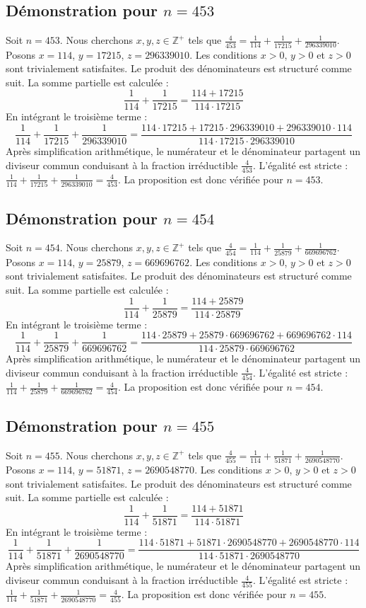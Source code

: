 \documentclass[11pt,a4paper]{article}
\begin{document}
\subsection{Démonstration pour $n = 453$}
Soit $n = 453$. Nous cherchons $x, y, z \in \mathbb{Z}^{+}$ tels que $\frac{4}{453} = \frac{1}{114} + \frac{1}{17215} + \frac{1}{296339010}$.
Posons $x = 114$, $y = 17215$, $z = 296339010$.
Les conditions $x > 0$, $y > 0$ et $z > 0$ sont trivialement satisfaites.
Le produit des dénominateurs est structuré comme suit. La somme partielle est calculée :
$$ \frac{1}{114} + \frac{1}{17215} = \frac{114+17215}{114 \cdot 17215} $$
En intégrant le troisième terme :
$$ \frac{1}{114} + \frac{1}{17215} + \frac{1}{296339010} = \frac{114 \cdot 17215 + 17215 \cdot 296339010 + 296339010 \cdot 114}{114 \cdot 17215 \cdot 296339010} $$
Après simplification arithmétique, le numérateur et le dénominateur partagent un diviseur commun conduisant à la fraction irréductible $\frac{4}{453}$.
L'égalité est stricte : $\frac{1}{114} + \frac{1}{17215} + \frac{1}{296339010} = \frac{4}{453}$.
La proposition est donc vérifiée pour $n = 453$.
\subsection{Démonstration pour $n = 454$}
Soit $n = 454$. Nous cherchons $x, y, z \in \mathbb{Z}^{+}$ tels que $\frac{4}{454} = \frac{1}{114} + \frac{1}{25879} + \frac{1}{669696762}$.
Posons $x = 114$, $y = 25879$, $z = 669696762$.
Les conditions $x > 0$, $y > 0$ et $z > 0$ sont trivialement satisfaites.
Le produit des dénominateurs est structuré comme suit. La somme partielle est calculée :
$$ \frac{1}{114} + \frac{1}{25879} = \frac{114+25879}{114 \cdot 25879} $$
En intégrant le troisième terme :
$$ \frac{1}{114} + \frac{1}{25879} + \frac{1}{669696762} = \frac{114 \cdot 25879 + 25879 \cdot 669696762 + 669696762 \cdot 114}{114 \cdot 25879 \cdot 669696762} $$
Après simplification arithmétique, le numérateur et le dénominateur partagent un diviseur commun conduisant à la fraction irréductible $\frac{4}{454}$.
L'égalité est stricte : $\frac{1}{114} + \frac{1}{25879} + \frac{1}{669696762} = \frac{4}{454}$.
La proposition est donc vérifiée pour $n = 454$.
\subsection{Démonstration pour $n = 455$}
Soit $n = 455$. Nous cherchons $x, y, z \in \mathbb{Z}^{+}$ tels que $\frac{4}{455} = \frac{1}{114} + \frac{1}{51871} + \frac{1}{2690548770}$.
Posons $x = 114$, $y = 51871$, $z = 2690548770$.
Les conditions $x > 0$, $y > 0$ et $z > 0$ sont trivialement satisfaites.
Le produit des dénominateurs est structuré comme suit. La somme partielle est calculée :
$$ \frac{1}{114} + \frac{1}{51871} = \frac{114+51871}{114 \cdot 51871} $$
En intégrant le troisième terme :
$$ \frac{1}{114} + \frac{1}{51871} + \frac{1}{2690548770} = \frac{114 \cdot 51871 + 51871 \cdot 2690548770 + 2690548770 \cdot 114}{114 \cdot 51871 \cdot 2690548770} $$
Après simplification arithmétique, le numérateur et le dénominateur partagent un diviseur commun conduisant à la fraction irréductible $\frac{4}{455}$.
L'égalité est stricte : $\frac{1}{114} + \frac{1}{51871} + \frac{1}{2690548770} = \frac{4}{455}$.
La proposition est donc vérifiée pour $n = 455$.
\end{document}
